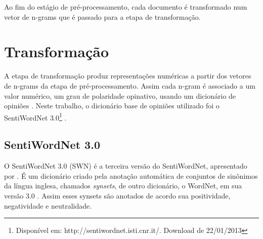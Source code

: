 Ao fim do estágio de pré-processamento, cada documento é transformado num vetor de n-grams que é passado para a etapa de transformação.  

\section{Transformação}


A etapa de transformação produz representações numéricas a partir dos vetores de n-grams da etapa de pré-processamento. Assim cada n-gram é associado a um valor numérico, um grau de polaridade opinativo, usando um dicionário de opiniões \cite{ballhysa2012fuzzy, moraes2012document, mouthami2013sentiment}. Neste trabalho, o dicionário base de opiniões utilizado  foi o SentiWordNet 3.0\footnote{Disponível em: http://sentiwordnet.isti.cnr.it/. Download de 22/01/2013} \cite{baccianella2010sentiwordnet}.

\subsection{SentiWordNet 3.0}

O SentiWordNet 3.0 (SWN) é a terceira versão do SentiWordNet, apresentado por \cite{esuli2006sentiwordnet}. É um dicionário criado pela anotação automática de conjuntos de sinônimos da língua inglesa, chamados \textit{synsets}, de outro dicionário, o WordNet, em sua versão 3.0 \cite{fellbaum2005wordnet}. Assim esses synsets são anotados de acordo sua positividade, negatividade e neutralidade. 


